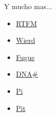 \documentclass{beamer}
\begin{document}
\begin{frame}{Y mucho mas...}
\begin{multicols}{2}
\begin{itemize}
    \item \hyperlink{https://esolangs.org/wiki/RTFM}{RTFM}
    \item \hyperlink{https://esolangs.org/wiki/Wierd}{Wierd}
    \item \hyperlink{https://esolangs.org/wiki/Fugue}{Fugue}
    \item \hyperlink{https://esolangs.org/wiki/DNA-Sharp}{DNA#}
    \item \hyperlink{https://esolangs.org/wiki/Pi}{Pi}
    \item \hyperlink{https://esolangs.org/wiki/Pit}{Pit}
\end{itemize}
\end{multicols}
    
\end{frame}
\end{document}
